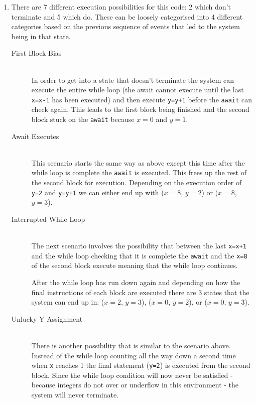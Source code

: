 \documentclass[12pt, a4paper]{article}
\begin{document}
\begin{enumerate}
\begin{enumerate}
        \end{enumerate}

    \item

		There are 7 different execution possibilities for this code: 2 which
		don't terminate and 5 which do. These can be loosely categorised into
		4 different categories based on the previous sequence of events that
		led to the system being in that state.

        \begin{description}

            \item[First Block Bias] \hfill \\
				In order to get into a state that doesn't terminate the system
				can execute the entire while loop (the await cannot execute
				until the last \texttt{x=x-1} has been executed) and then
				execute \texttt{y=y+1} before the \texttt{await} can check
				again. This leads to the first block being finished and the
				second block stuck on the \texttt{await} because $x=0$ and
				$y=1$.

            \vspace{0.2cm}
            \item[Await Executes] \hfill \\
				This scenario starts the same way as above except this time
				after the while loop is complete the \texttt{await} is
				executed. This frees up the rest of the second block for
				execution. Depending on the execution order of \texttt{y=2} and
				\texttt{y=y+1} we can either end up with ($x=8$, $y=2$) or
				($x=8$, $y=3$).

            \vspace{0.2cm}
            \item[Interrupted While Loop] \hfill \\
				The next scenario involves the possibility that between the
				last \texttt{x=x+1} and the while loop checking that it is
				complete the \texttt{await} and the \texttt{x=8} of the second
				block execute meaning that the while loop continues.

				After the while loop has run down again and depending on how
				the final instructions of each block are executed there are
				3 states that the system can end up in: ($x=2$, $y=3$), ($x=0$,
				$y=2$), or ($x=0$, $y=3$).

            \vspace{0.2cm}
            \item[Unlucky Y Assignment] \hfill \\
				There is another possibility that is similar to the scenario
				above. Instead of the while loop counting all the way down
				a second time when \texttt{x} reaches 1 the final statement
				(\texttt{y=2}) is executed from the second block. Since the
				while loop condition will now never be satisfied - because
				integers do not over or underflow in this environment - the
				system will never terminate.


\end{description}
\end{enumerate}
\end{document}
